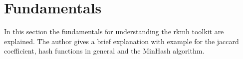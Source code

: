 \section{Fundamentals}

In this section the fundamentals for understanding the rkmh toolkit are explained. The author gives a brief explanation with example for the jaccard coefficient, hash functions in general and the MinHash algorithm.



